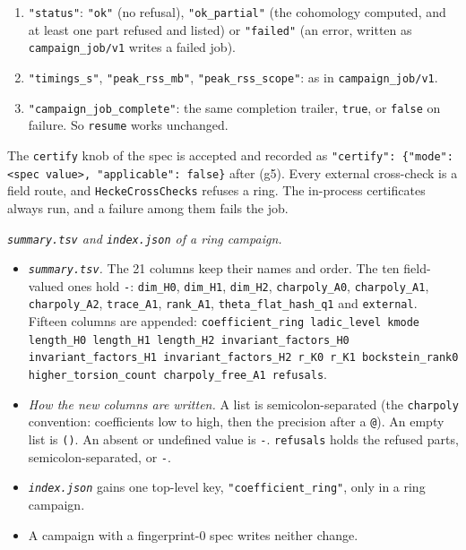\documentclass[11pt]{article}
\theoremstyle{remark}
\begin{document}
\begin{enumerate}[label=(g\arabic*)]
  that was refused by name. \texttt{part} is one of \texttt{"hecke"}, \texttt{"bockstein"},
  \texttt{"reduction"}. \texttt{message} carries the tag
  \texttt{not\_implemented\_in\_this\_build:}. A refused part is \textbf{never silently skipped}.
  \begin{itemize}
  \item At $\ell\in\{2,3\}$, \texttt{hecke}, \texttt{bockstein} and \texttt{reduction} are refused
    (\texttt{HeckeOperatorOnK}, \texttt{HeckeReduction}).
  \item At $r\ge2$, \texttt{hecke} is refused at the job loop's own dispatch: $T_{p^r}$ over the
    ring is not validated in this build.
  \end{itemize}
  The list is empty when nothing was refused.
\item \texttt{"status"}: \texttt{"ok"} (no refusal), \texttt{"ok\_partial"} (the cohomology
  computed, and at least one part refused and listed) or \texttt{"failed"} (an error, written as
  \texttt{campaign\_job/v1} writes a failed job).
\item \texttt{"timings\_s"}, \texttt{"peak\_rss\_mb"}, \texttt{"peak\_rss\_scope"}: as in
  \texttt{campaign\_job/v1}.
\item \texttt{"campaign\_job\_complete"}: the same completion trailer, \texttt{true}, or
  \texttt{false} on failure. So \texttt{resume} works unchanged.
\end{enumerate}
The \texttt{certify} knob of the spec is accepted and recorded as \texttt{"certify": \{"mode":
<spec value>, "applicable": false\}} after (g5). Every external cross-check is a field route, and
\texttt{HeckeCrossChecks} refuses a ring. The in-process certificates always run, and a failure
among them fails the job.

\emph{\texttt{summary.tsv} and \texttt{index.json} of a ring campaign.}
\begin{itemize}
\item \emph{\texttt{summary.tsv}.} The 21 columns keep their names and order. The ten field-valued
  ones hold \texttt{-}: \texttt{dim\_H0}, \texttt{dim\_H1}, \texttt{dim\_H2},
  \texttt{charpoly\_A0}, \texttt{charpoly\_A1}, \texttt{charpoly\_A2}, \texttt{trace\_A1},
  \texttt{rank\_A1}, \texttt{theta\_flat\_hash\_q1} and \texttt{external}. Fifteen columns are
  appended: \texttt{coefficient\_ring ladic\_level kmode length\_H0 length\_H1 length\_H2
  invariant\_factors\_H0 invariant\_factors\_H1 invariant\_factors\_H2 r\_K0 r\_K1
  bockstein\_rank0 higher\_torsion\_count charpoly\_free\_A1 refusals}.
\item \emph{How the new columns are written.} A list is semicolon-separated (the \texttt{charpoly}
  convention: coefficients low to high, then the precision after a \texttt{@}). An empty list is
  \texttt{()}. An absent or undefined value is \texttt{-}. \texttt{refusals} holds the refused
  parts, semicolon-separated, or \texttt{-}.
\item \emph{\texttt{index.json}} gains one top-level key, \texttt{"coefficient\_ring"}, only in a
  ring campaign.
\item A campaign with a fingerprint-$0$ spec writes neither change.
\end{itemize}
\end{document}

